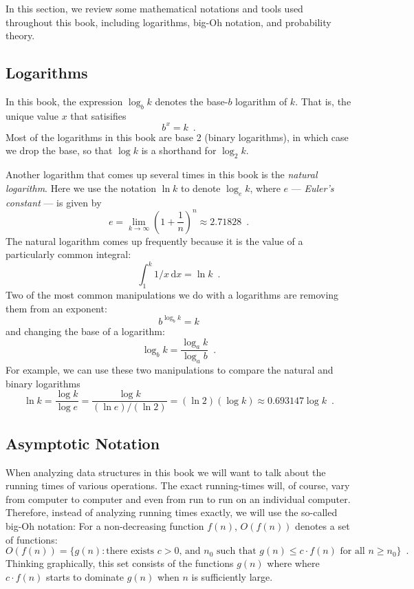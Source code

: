In this section, we review some mathematical notations and tools
used throughout this book, including logarithms, big-Oh notation, and
probability theory.

\subsection{Logarithms}

In this book, the expression $\log_b k$ denotes the base-$b$ logarithm
of $k$.  That is, the unique value $x$ that satisifies
\[
    b^{x} = k  \enspace .
\]
Most of the logarithms in this book are base 2 (binary logarithms),
in which case we drop the base, so that $\log k$ is a shorthand for
$\log_2 k$.

Another logarithm that comes up several times in this book is the
\emph{natural logarithm}.  Here we use the notation $\ln k$ to denote
$\log_e k$, where $e$ --- \emph{Euler's constant} --- is given by
\[
   e = \lim_{k\rightarrow\infty} \left(1+\frac{1}{n}\right)^n
   \approx  2.71828 \enspace .
\]
The natural logarithm comes up frequently because it is the value
of a particularly common integral:
\[
    \int_{1}^{k} 1/x\,\mathrm{d}x  = \ln k \enspace .
\]
Two of the most common manipulations we do with a logarithms are removing them from an exponent:
\[
    b^{\log_b k} = k
\]
and changing the base of a logarithm:
\[
    \log_b k = \frac{\log_a k}{\log_a b} \enspace .
\]
For example, we can use these two manipulations to compare the natural and binary logarithms
\[
   \ln k = \frac{\log k}{\log e} = \frac{\log k}{(\ln e)/(\ln 2)} = 
    (\ln 2)(\log k) \approx 0.693147\log k \enspace .
\]

\subsection{Asymptotic Notation}

When analyzing data structures in this book we will want to talk about
the running times of various operations.  The exact running-times will,
of course, vary from computer to computer and even from run to run on
an individual computer.  Therefore, instead of analyzing running times
exactly, we will use the so-called big-Oh notation: For a non-decreasing
function $f(n)$, $O(f(n))$ denotes a set of functions:
\[
   O(f(n)) = \{g(n):\mbox{there exists $c>0$, and $n_0$ such that
             $g(n) \le c\cdot f(n)$ for all $n\ge n_0$}   \} \enspace .
\]
Thinking graphically, this set consists of the functions $g(n)$ where
where $c\cdot f(n)$ starts to dominate $g(n)$ when $n$ is sufficiently
large.

